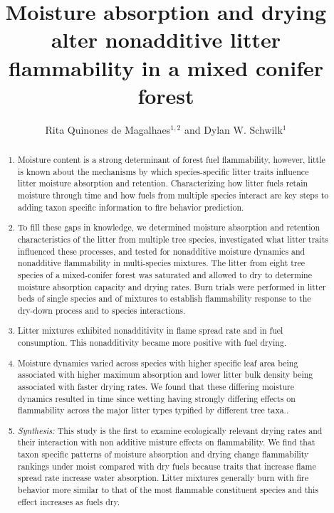 \documentclass[letterpaper,12pt]{article}
\title{Moisture absorption and drying alter nonadditive litter flammability
  in a mixed conifer forest}
\author{Rita Quinones de Magalhaes$^{1,2}$ and Dylan W. Schwilk$^1$}
\begin{document}
\maketitle

\begin{abstract}
  \noindent \begin{enumerate}
    
      \item Moisture content is a strong determinant of forest fuel
    flammability, however, little is known about the mechanisms by which
    species-specific litter traits influence litter moisture absorption and
    retention. Characterizing how litter fuels retain moisture through time and
    how fuels from multiple species interact are key steps to adding taxon
    specific information to fire behavior prediction.

      \item To fill these gaps in knowledge, we determined moisture absorption
    and retention characteristics of the litter from multiple tree species,
    investigated what litter traits influenced these processes, and tested for
    nonadditive moisture dynamics and nonadditive flammability in multi-species
    mixtures. The litter from eight tree species of a mixed-conifer forest was
    saturated and allowed to dry to determine moisture absorption capacity and
    drying rates. Burn trials were performed in litter beds of single species
    and of mixtures to establish flammability response to the dry-down process
    and to species interactions.
   
        \item  Litter mixtures exhibited nonadditivity in flame spread rate and in
    fuel consumption. This nonadditivity became more positive with fuel drying.
    
      \item Moisture dynamics varied across species with higher specific leaf
    area being associated with higher maximum absorption and lower litter bulk
    density being associated with faster drying rates. We found that these
    differing moisture dynamics resulted in time since wetting having strongly
    differing effects on flammability across the major litter types typified by
    different tree taxa..
    
      \item \emph{Synthesis:} This study is the first to examine ecologically
    relevant drying rates and their interaction with non additive misture
    effects on flammability. We find that taxon specific patterns of moisture
    absorption and drying change flammability rankings under moist compared
    with dry fuels because traits that increase flame spread rate increase
    water absorption. Litter mixtures generally burn with fire behavior more
    similar to that of the most flammable constituent species and this effect
    increases as fuels dry.
   
  \end{enumerate}
\end{abstract}
\end{document}
